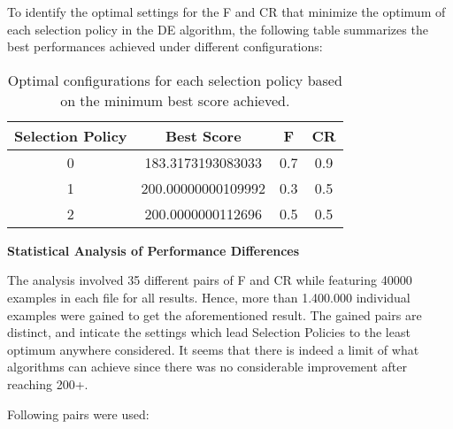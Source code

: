 \documentclass[12pt,a4paper]{article}
\begin{document}
To identify the optimal settings for the F and CR that minimize the optimum of each selection policy in the DE algorithm, the following table summarizes the best performances achieved under different configurations:

\begin{table}[h]
\centering
\begin{tabular}{cccc}
\hline
\textbf{Selection Policy} & \textbf{Best Score} & \textbf{F} & \textbf{CR} \\ \hline
0                         & 183.3173193083033              & 0.7        & 0.9         \\
1                         & 200.00000000109992              & 0.3        & 0.5         \\
2                         & 200.0000000112696             & 0.5        & 0.5         \\ \hline
\end{tabular}
\caption{Optimal configurations for each selection policy based on the minimum best score achieved.}
\label{tab:optimal-configurations}
\end{table}
\vspace{3mm}
\textbf{Statistical Analysis of Performance Differences}

The analysis involved 35 different pairs of F and CR while featuring 40000 examples in each file for all results. Hence, more than 1.400.000 individual examples were gained to get the aforementioned result. The gained pairs are distinct, and inticate the settings which lead Selection Policies to the least optimum anywhere considered.
It seems that there is indeed a limit of what algorithms can achieve since there was no considerable improvement after reaching 200+.

Following pairs were used:
\end{document}
